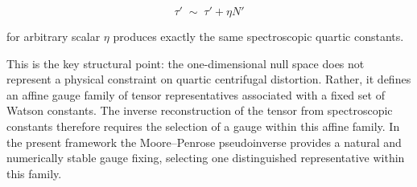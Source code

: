 \begin{equation}
\tau' \;\sim\; \tau' + \eta N'
\label{eq:quartic_affine_family}
\end{equation}

for arbitrary scalar $\eta$ produces exactly the same spectroscopic
quartic constants.

This is the key structural point: the one-dimensional null space does
not represent a physical constraint on quartic centrifugal distortion.
Rather, it defines an affine gauge family of tensor representatives
associated with a fixed set of Watson constants. The inverse
reconstruction of the tensor from spectroscopic constants therefore
requires the selection of a gauge within this affine family. In the
present framework the Moore--Penrose pseudoinverse provides a natural
and numerically stable gauge fixing, selecting one distinguished
representative within this family.
